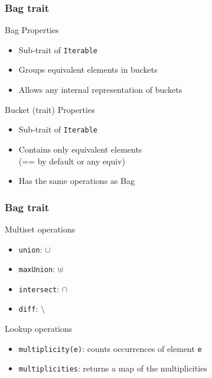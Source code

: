 \documentclass{beamer}
\begin{document}
\begin{frame}[fragile]
	\frametitle{Bag trait}
	\begin{block}{Bag Properties}
		\begin{itemize}
			\item Sub-trait of \texttt{Iterable}
			\item Groups equivalent elements in buckets
			\item Allows any internal representation of buckets
		\end{itemize}
	\end{block}
	\begin{block}{Bucket (trait) Properties}
		\begin{itemize}
			\item Sub-trait of \texttt{Iterable}
			\item Contains only equivalent elements \\(== by default or any equiv)
			\item Has the same operations as Bag
		\end{itemize}
	\end{block}
\end{frame}

\begin{frame}[fragile]
	\frametitle{Bag trait}
	\begin{block}{Multiset operations}
		\begin{itemize}
			\item \texttt{union}: $\cup$
			\item \texttt{maxUnion}: $\uplus$
			\item \texttt{intersect}: $\cap$
			\item \texttt{diff}: $\setminus$
		\end{itemize}
	\end{block}
	\begin{block}{Lookup operations}
		\begin{itemize}
			\item \texttt{multiplicity(e)}: counts occurrences of element \texttt{e}
			\item \texttt{multiplicities}: returns a map of the multiplicities
		\end{itemize}
	\end{block}
\end{frame}
\end{document}
